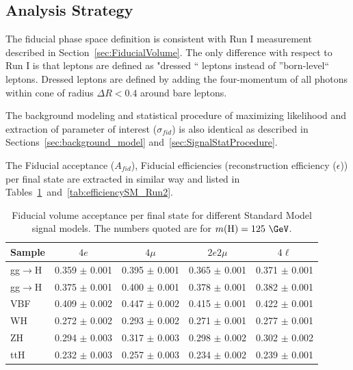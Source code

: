 \subsection{Analysis Strategy}
 The fiducial phase space definition is consistent with Run I measurement described in Section~\ref{sec:FiducialVolume}. The only difference 
 with respect to Run I is that leptons are defined as "dressed `` leptons instead of ''born-level`` leptons. Dressed leptons are defined by 
 adding the four-momentum of all photons within cone of radius $\Delta R < 0.4$  around bare leptons.
 \par The background modeling and statistical procedure of maximizing likelihood and extraction of parameter of interest ($\sigma_{fid}$) is also 
 identical as described in Sections~\ref{sec:background_model} and~\ref{sec:SignalStatProcedure}.
 \par The Fiducial acceptance ($A_{fid}$), Fiducial efficiencies (reconstruction efficiency ($\epsilon$)) per final state  are extracted in
 similar way and listed in Tables~\ref{tab:acceptanceSM_Run2}~and~\ref{tab:efficiencySM_Run2}.
 \begin{table}[!h!tb]
\begin{center}
\small
\caption{
Fiducial volume acceptance per final state for different Standard Model signal models. The numbers quoted are for $m({\rm H})=125~\GeV$.
\label{tab:acceptanceSM_Run2}
}
\begin{tabular}{|l|c|c|c|c|} \hline
Sample & $4e$ & $4\mu$ & $2e2\mu$ & $4\ell$ \\ \hline

gg$\rightarrow$H & 0.359 $\pm$ 0.001 & 0.395 $\pm$ 0.001 & 0.365 $\pm$ 0.001 & 0.371 $\pm$ 0.001 \\
gg$\rightarrow$H & 0.375 $\pm$ 0.001 & 0.400 $\pm$ 0.001 & 0.378 $\pm$ 0.001 & 0.382 $\pm$ 0.001 \\
VBF & 0.409 $\pm$ 0.002 & 0.447 $\pm$ 0.002 & 0.415 $\pm$ 0.001 & 0.422 $\pm$ 0.001 \\
WH  & 0.272 $\pm$ 0.002 & 0.293 $\pm$ 0.002 & 0.271 $\pm$ 0.001 & 0.277 $\pm$ 0.001 \\
ZH  & 0.294 $\pm$ 0.003 & 0.317 $\pm$ 0.003 & 0.298 $\pm$ 0.002 & 0.302 $\pm$ 0.002 \\
ttH & 0.232 $\pm$ 0.003 & 0.257 $\pm$ 0.003 & 0.234 $\pm$ 0.002 & 0.239 $\pm$ 0.001 \\

\hline
\end{tabular}
\normalsize
\end{center}
\end{table}
